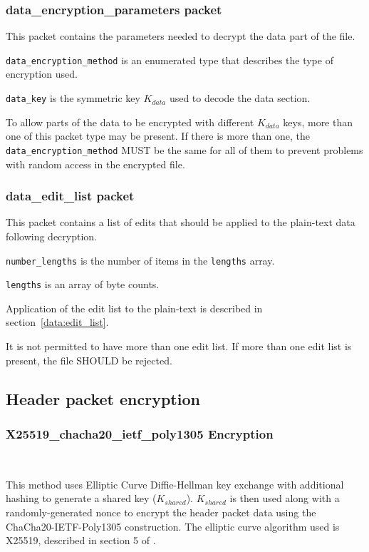\documentclass[10pt]{article}
\newcommand{\kw}[1]{\texttt{#1}}
\begin{document}
\subsubsection{data\_encryption\_parameters packet}\label{header:data_encryption_parameters}

This packet contains the parameters needed to decrypt the data part of the file.

\kw{data\_encryption\_method} is an enumerated type that describes the type of encryption used.

\kw{data\_key} is the symmetric key $K_{data}$ used to decode the data section.

To allow parts of the data to be encrypted with different $K_{data}$ keys,
more than one of this packet type may be present.
If there is more than one, the \kw{data\_encryption\_method} MUST be the same for all of them to prevent problems
with random access in the encrypted file.

\subsubsection{data\_edit\_list packet}

This packet contains a list of edits that should be applied to the plain-text data following decryption.

\kw{number\_lengths} is the number of items in the \kw{lengths} array.

\kw{lengths} is an array of byte counts.

Application of the edit list to the plain-text is described in section~\ref{data:edit_list}.

It is not permitted to have more than one edit list.
If more than one edit list is present, the file SHOULD be rejected.

\subsection{Header packet encryption}

\subsubsection{X25519\_chacha20\_ietf\_poly1305 Encryption}~\label{header:X25519}

This method uses Elliptic Curve Diffie-Hellman key exchange with additional hashing to generate a shared
key ($K_{shared}$).
$K_{shared}$ is then used along with a randomly-generated nonce to encrypt the header packet data using the
ChaCha20-IETF-Poly1305 construction.
The elliptic curve algorithm used is X25519, described in section 5 of \cite{RFC7748}.
\end{document}
